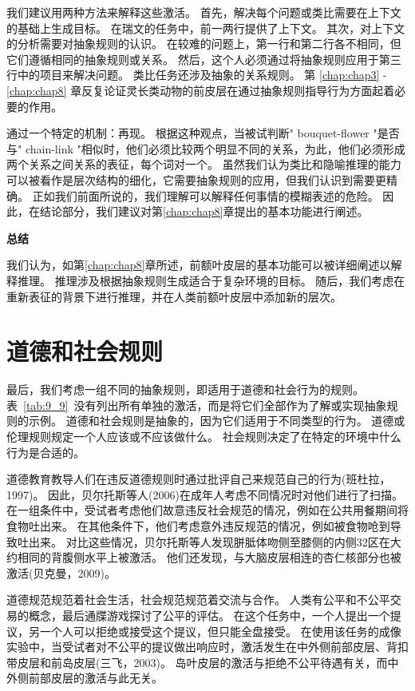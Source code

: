 我们建议用两种方法来解释这些激活。
首先，解决每个问题或类比需要在上下文的基础上生成目标。
在瑞文的任务中，前一两行提供了上下文。
其次，对上下文的分析需要对抽象规则的认识。
在较难的问题上，第一行和第二行各不相同，但它们遵循相同的抽象规则或关系。
然后，这个人必须通过将抽象规则应用于第三行中的项目来解决问题。
类比任务还涉及抽象的关系规则。
第 \ref{chap:chap3} - \ref{chap:chap8} 章反复论证灵长类动物的前皮层在通过抽象规则指导行为方面起着必要的作用。


通过一个特定的机制：再现。
根据这种观点，当被试判断" bouquet-flower "是否与" chain-link "相似时，他们必须比较两个明显不同的关系，为此，他们必须形成两个关系之间关系的表征，每个词对一个。
虽然我们认为类比和隐喻推理的能力可以被看作是层次结构的细化，它需要抽象规则的应用，但我们认识到需要更精确。
正如我们前面所说的，我们理解可以解释任何事情的模糊表述的危险。
因此，在结论部分，我们建议对第\ref{chap:chap8}章提出的基本功能进行阐述。



\textbf{总结}

我们认为，如第\ref{chap:chap8}章所述，前额叶皮层的基本功能可以被详细阐述以解释推理。
推理涉及根据抽象规则生成适合于复杂环境的目标。
随后，我们考虑在重新表征的背景下进行推理，并在人类前额叶皮层中添加新的层次。



\section{道德和社会规则}

最后，我们考虑一组不同的抽象规则，即适用于道德和社会行为的规则。
表~\ref{tab:9_9}~没有列出所有单独的激活，而是将它们全部作为了解或实现抽象规则的示例。
道德和社会规则是抽象的，因为它们适用于不同类型的行为。
道德或伦理规则规定一个人应该或不应该做什么。
社会规则决定了在特定的环境中什么行为是合适的。


道德教育教导人们在违反道德规则时通过批评自己来规范自己的行为(班杜拉，1997)。
因此，贝尔托斯等人(2006)在成年人考虑不同情况时对他们进行了扫描。
在一组条件中，受试者考虑他们故意违反社会规范的情况，例如在公共用餐期间将食物吐出来。
在其他条件下，他们考虑意外违反规范的情况，例如被食物呛到导致吐出来。
对比这些情况，贝尔托斯等人发现胼胝体吻侧至膝侧的内侧32区在大约相同的背腹侧水平上被激活。
他们还发现，与大脑皮层相连的杏仁核部分也被激活(贝克曼，2009)。


道德规范规范着社会生活，社会规范规范着交流与合作。
人类有公平和不公平交易的概念，最后通牒游戏探讨了公平的评估。
在这个任务中，一个人提出一个提议，另一个人可以拒绝或接受这个提议，但只能全盘接受。
在使用该任务的成像实验中，当受试者对不公平的提议做出响应时，激活发生在中外侧前部皮层、背扣带皮层和前岛皮层(三飞，2003)。
岛叶皮层的激活与拒绝不公平待遇有关，而中外侧前部皮层的激活与此无关。


